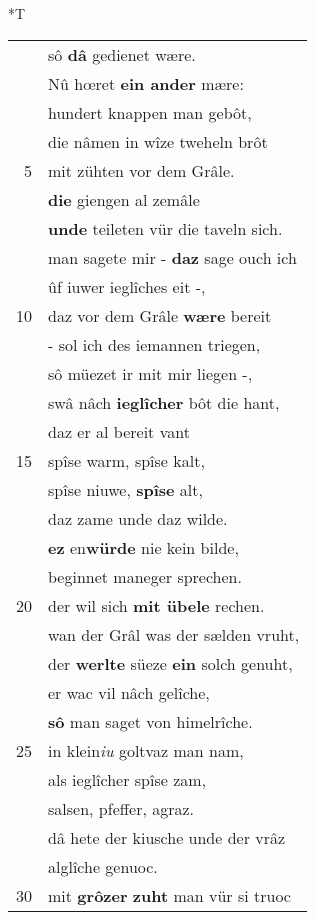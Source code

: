 \documentclass[8pt,a4paper,notitlepage]{article}
\begin{document}
\begin{table}[ht]
\begin{minipage}[t]{0.5\linewidth}
\small
\begin{center}*T
\end{center}
\begin{tabular}{rl}
 & sô \textbf{dâ} gedienet wære.\\ 
 & Nû hœret \textbf{ein ander} mære:\\ 
 & hundert knappen man gebôt,\\ 
 & die nâmen in wîze tweheln brôt\\ 
5 & mit zühten vor dem Grâle.\\ 
 & \textbf{die} giengen al zemâle\\ 
 & \textbf{unde} teileten vür die taveln sich.\\ 
 & man sagete mir - \textbf{daz} sage ouch ich\\ 
 & ûf iuwer ieglîches eit -,\\ 
10 & daz vor dem Grâle \textbf{wære} bereit\\ 
 & - sol ich des iemannen triegen,\\ 
 & sô müezet ir mit mir liegen -,\\ 
 & swâ nâch \textbf{ieglîcher} bôt die hant,\\ 
 & daz er al bereit vant\\ 
15 & spîse warm, spîse kalt,\\ 
 & spîse niuwe, \textbf{spîse} alt,\\ 
 & daz zame unde daz wilde.\\ 
 & \textbf{ez} en\textbf{würde} nie kein bilde,\\ 
 & beginnet maneger sprechen.\\ 
20 & der wil sich \textbf{mit übele} rechen.\\ 
 & wan der Grâl was der sælden vruht,\\ 
 & der \textbf{werlte} süeze \textbf{ein} solch genuht,\\ 
 & er wac vil nâch gelîche,\\ 
 & \textbf{sô} man saget von himelrîche.\\ 
25 & in klein\textit{iu} goltvaz man nam,\\ 
 & als ieglîcher spîse zam,\\ 
 & salsen, pfeffer, agraz.\\ 
 & dâ hete der kiusche unde der vrâz\\ 
 & alglîche genuoc.\\ 
30 & mit \textbf{grôzer} \textbf{zuht} man vür si truoc\\ 
\end{tabular}

\end{minipage}
\end{table}
\end{document}
